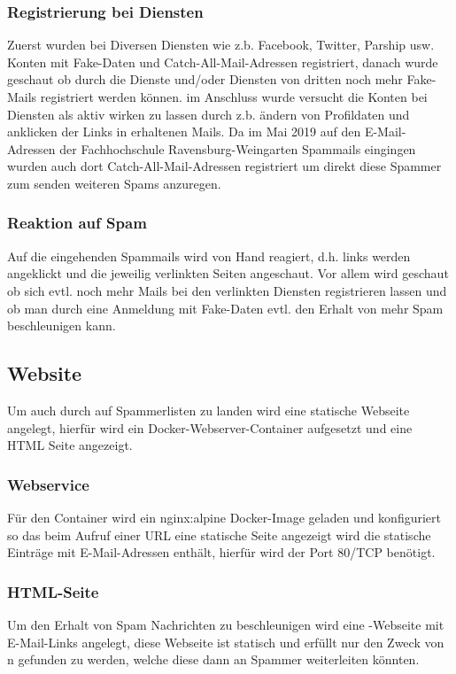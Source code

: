 \documentclass[a4paper,11pt,singlespacing]{article}
\begin{document}
		\subsubsection{Registrierung bei Diensten}\label{AdressenVerbreitenRegistrierenDiensten}
		Zuerst wurden bei Diversen Diensten wie z.b. Facebook, Twitter, Parship usw. Konten mit Fake-Daten und Catch-All-Mail-Adressen registriert, danach wurde geschaut ob durch die Dienste und/oder Diensten von dritten noch mehr Fake-Mails registriert werden können. im Anschluss wurde versucht die Konten bei Diensten als aktiv wirken zu lassen durch z.b. ändern von Profildaten und anklicken der Links in erhaltenen Mails. Da im Mai 2019 auf den E-Mail-Adressen der Fachhochschule Ravensburg-Weingarten Spammails eingingen wurden auch dort Catch-All-Mail-Adressen registriert um direkt diese Spammer zum senden weiteren Spams anzuregen.
		
		\subsubsection{Reaktion auf Spam}\label{AdressenVerbreitenReaktionSpam}
		Auf die eingehenden Spammails wird von Hand reagiert, d.h. links werden angeklickt und die jeweilig verlinkten Seiten angeschaut. Vor allem wird geschaut ob sich evtl. noch mehr Mails bei den verlinkten Diensten registrieren lassen und ob man durch eine Anmeldung mit Fake-Daten evtl. den Erhalt von mehr Spam beschleunigen kann.
	
	\subsection{Website}\label{sec:UmsetzungWebsite}
		Um auch durch  auf Spammerlisten zu landen wird eine statische Webseite angelegt, hierfür wird ein Docker-Webserver-Container aufgesetzt und eine HTML Seite angezeigt.

		\subsubsection{Webservice}\label{WebsiteWebservice}
			Für den Container wird ein nginx:alpine Docker-Image geladen und konfiguriert so das beim Aufruf einer URL eine statische Seite angezeigt wird die statische Einträge mit E-Mail-Adressen enthält, hierfür wird der Port 80/TCP benötigt.
			
		\subsubsection{HTML-Seite}\label{WebsiteHTML-Seite}
			Um den Erhalt von Spam Nachrichten zu beschleunigen wird eine -Webseite mit E-Mail-Links angelegt, diese Webseite ist statisch und erfüllt nur den Zweck von n gefunden zu werden, welche diese dann an Spammer weiterleiten könnten.
\end{document}

